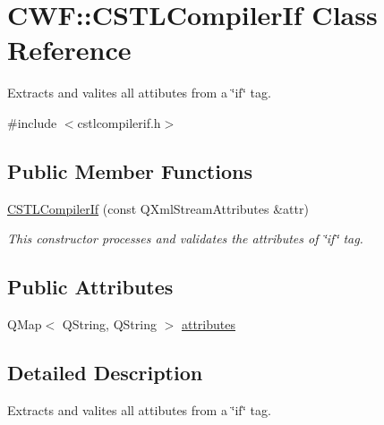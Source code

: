 \hypertarget{class_c_w_f_1_1_c_s_t_l_compiler_if}{\section{C\+W\+F\+:\+:C\+S\+T\+L\+Compiler\+If Class Reference}
\label{class_c_w_f_1_1_c_s_t_l_compiler_if}
}


Extracts and valites all attibutes from a \char`\"{}if\char`\"{} tag.  




{\ttfamily \#include $<$cstlcompilerif.\+h$>$}

\subsection*{Public Member Functions}
\begin{DoxyCompactItemize}
\item 
\hyperlink{class_c_w_f_1_1_c_s_t_l_compiler_if_a6fff1cab935cc881a8d444c51e1d1163}{C\+S\+T\+L\+Compiler\+If} (const Q\+Xml\+Stream\+Attributes \&attr)
\begin{DoxyCompactList}\small\item\em This constructor processes and validates the attributes of \char`\"{}if\char`\"{} tag. \end{DoxyCompactList}\end{DoxyCompactItemize}
\subsection*{Public Attributes}
\begin{DoxyCompactItemize}
\item 
Q\+Map$<$ Q\+String, Q\+String $>$ \hyperlink{class_c_w_f_1_1_c_s_t_l_compiler_if_a63f36fca57a21e38d555b6e52173ef0a}{attributes}
\end{DoxyCompactItemize}


\subsection{Detailed Description}
Extracts and valites all attibutes from a \char`\"{}if\char`\"{} tag. 

